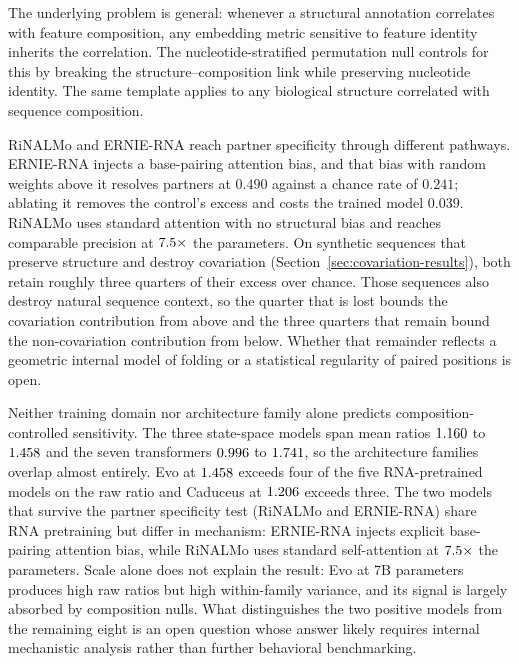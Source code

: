\documentclass[11pt]{article}
\begin{document}
The underlying problem is general: whenever a structural annotation
correlates with feature composition, any embedding metric sensitive to
feature identity inherits the correlation. The nucleotide-stratified
permutation null controls for this by breaking the structure--composition
link while preserving nucleotide identity. The same template applies to
any biological structure correlated with sequence composition.

RiNALMo and ERNIE-RNA reach partner specificity through different pathways.
ERNIE-RNA injects a base-pairing attention bias, and that bias with random
weights above it resolves partners at $0.490$ against a chance rate of $0.241$;
ablating it removes the control's excess and costs the trained model $0.039$.
RiNALMo uses standard attention with no structural bias and reaches comparable
precision at $7.5{}\times$ the parameters. On synthetic sequences that preserve
structure and destroy covariation (Section~\ref{sec:covariation-results}), both
retain roughly three quarters of their excess over chance. Those sequences also
destroy natural sequence context, so the quarter that is lost bounds the
covariation contribution from above and the three quarters that remain bound
the non-covariation contribution from below. Whether that remainder reflects a
geometric internal model of folding or a statistical regularity of paired
positions is open.

Neither training domain nor architecture family alone predicts
composition-controlled sensitivity. The three state-space models span mean
ratios $1.160{}$ to $1.458{}$ and the seven transformers
$0.996{}$ to $1.741{}$, so the architecture families overlap
almost entirely. Evo at $1.458{}$ exceeds four of the five RNA-pretrained
models on the raw ratio and Caduceus at $1.206{}$ exceeds three. The two models
that survive the partner specificity test (RiNALMo and ERNIE-RNA) share
RNA pretraining but differ in mechanism: ERNIE-RNA injects explicit
base-pairing attention bias, while RiNALMo uses standard self-attention at
$7.5{}\times$ the parameters. Scale alone does not explain the result:
Evo at 7B parameters produces high raw ratios but high within-family
variance, and its signal is largely absorbed by composition nulls. What
distinguishes the two positive models from the remaining eight is an open
question whose answer likely requires internal mechanistic analysis rather
than further behavioral benchmarking.
\end{document}
